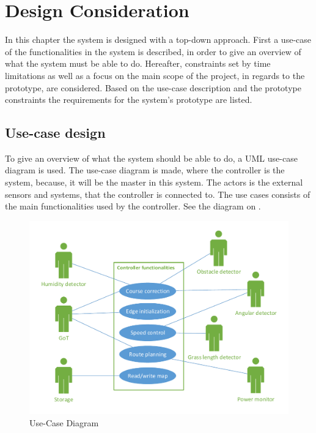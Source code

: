 \chapter{Design Consideration}
\vspace{-5 mm}
In this chapter the system is designed with a top-down approach. First a use-case of the functionalities in the system is described, in order to give an overview of what the system must be able to do. Hereafter, constraints set by time limitations as well as a focus on the main scope of the project, in regards to the prototype, are considered. Based on the use-case description and the prototype constraints the requirements for the system's prototype are listed.
\vspace{-4 mm}
\section{Use-case design}
To give an overview of what the system should be able to do, a UML use-case diagram is used. The use-case diagram is made, where the controller is the system, because, it will be the master in this system. The actors is the external sensors and systems, that the controller is connected to. The use cases consists of the main functionalities used by the controller. See the diagram on . 
\vspace{-3 mm}
 \begin{figure}[H]
	\centering
	\includegraphics[scale=0.8]{figures/P5UseCase.pdf}
	\caption{Use-Case Diagram}
	\label{fig:usecase}
\end{figure}

